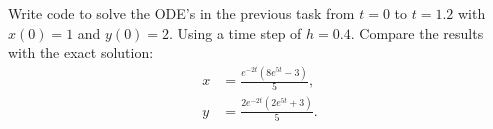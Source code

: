 \documentclass[a4paper, 12pt]{config/homework}
\begin{document}
\vspace{\baselineskip}\noindent
Write code to solve the ODE's in the previous task from \(t=0\) to \(t=1.2\) with \(x(0)=1\) and \(y(0)=2\). Using a time step of \(h=0.4\). Compare the results with the exact solution:
\begin{align*}
x &= \frac{e^{-2t}\left(8e^{5t}-3\right)}{5},
\\ y &= \frac{2e^{-2t}\left(2e^{5t}+3\right)}{5}.
\end{align*}
\end{document}
